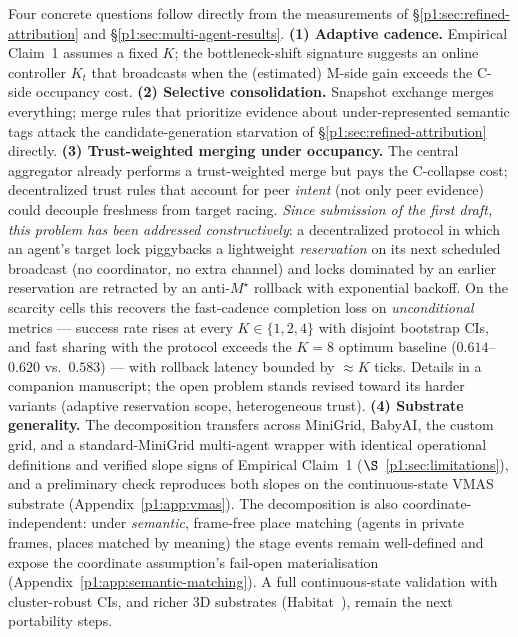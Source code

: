 \documentclass{article}
\begin{document}
Four concrete questions follow directly from the measurements of \S\ref{p1:sec:refined-attribution} and \S\ref{p1:sec:multi-agent-results}.
\textbf{(1) Adaptive cadence.} Empirical Claim~1 assumes a fixed $K$; the bottleneck-shift signature suggests an online controller $K_t$ that broadcasts when the (estimated) M-side gain exceeds the C-side occupancy cost.
\textbf{(2) Selective consolidation.} Snapshot exchange merges everything; merge rules that prioritize evidence about under-represented semantic tags attack the candidate-generation starvation of \S\ref{p1:sec:refined-attribution} directly.
\textbf{(3) Trust-weighted merging under occupancy.} The central aggregator already performs a trust-weighted merge but pays the C-collapse cost; decentralized trust rules that account for peer \emph{intent} (not only peer evidence) could decouple freshness from target racing. \emph{Since submission of the first draft, this problem has been addressed constructively}: a decentralized protocol in which an agent's target lock piggybacks a lightweight \emph{reservation} on its next scheduled broadcast (no coordinator, no extra channel) and locks dominated by an earlier reservation are retracted by an anti-$M^\star$ rollback with exponential backoff. On the scarcity cells this recovers the fast-cadence completion loss on \emph{unconditional} metrics --- success rate rises at every $K\in\{1,2,4\}$ with disjoint bootstrap CIs, and fast sharing with the protocol exceeds the $K{=}8$ optimum baseline ($0.614$--$0.620$ vs.\ $0.583$) --- with rollback latency bounded by ${\approx}K$ ticks. Details in a companion manuscript; the open problem stands revised toward its harder variants (adaptive reservation scope, heterogeneous trust).
\textbf{(4) Substrate generality.} The decomposition transfers across MiniGrid, BabyAI, the custom grid, and a standard-MiniGrid multi-agent wrapper with identical operational definitions and verified slope signs of Empirical Claim~1 ($\S$~\ref{p1:sec:limitations}), and a preliminary check reproduces both slopes on the continuous-state VMAS substrate (Appendix~\ref{p1:app:vmas}). The decomposition is also coordinate-independent: under \emph{semantic}, frame-free place matching (agents in private frames, places matched by meaning) the stage events remain well-defined and expose the coordinate assumption's fail-open materialisation (Appendix~\ref{p1:app:semantic-matching}). A full continuous-state validation with cluster-robust CIs, and richer 3D substrates (Habitat~\citep{savva2019habitat}), remain the next portability steps.
\end{document}

